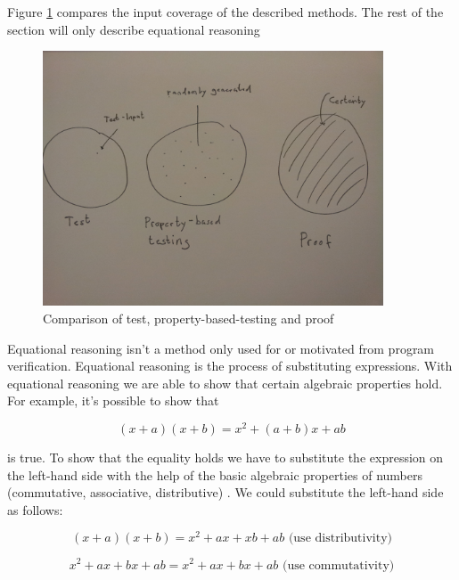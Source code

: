 Figure \ref{fig:property_validation} compares the input coverage of the described methods. The rest of the section will only describe equational reasoning

\begin{figure}
  \centering
     \includegraphics[width=0.9\textwidth]{comp}
  \caption{Comparison of test, property-based-testing and proof}
  \label{fig:property_validation}
\end{figure}

Equational reasoning isn't a method only used for or motivated from program verification. Equational reasoning is the process of substituting expressions. With equational reasoning we are able to show that certain algebraic properties hold.
For example, it's possible to show that

\begin{equation}
  \label{eq:sum}
  (x+a)(x+b) = x^2 + (a+b)x+ab
\end{equation}

is true. To show that the equality holds we have to substitute the expression on the left-hand side with the help of the basic algebraic properties of numbers (commutative, associative, distributive) \cite{hutton}. We could substitute the left-hand side as follows:

\begin{equation}
  \label{eq:algebra}
  (x+a)(x+b) = x^2 + ax + xb + ab \text{     (use distributivity)}
\end{equation}

\begin{equation}
x^2 + ax + bx + ab = x^2 + ax + bx + ab \text{     (use commutativity)}
\end{equation}

